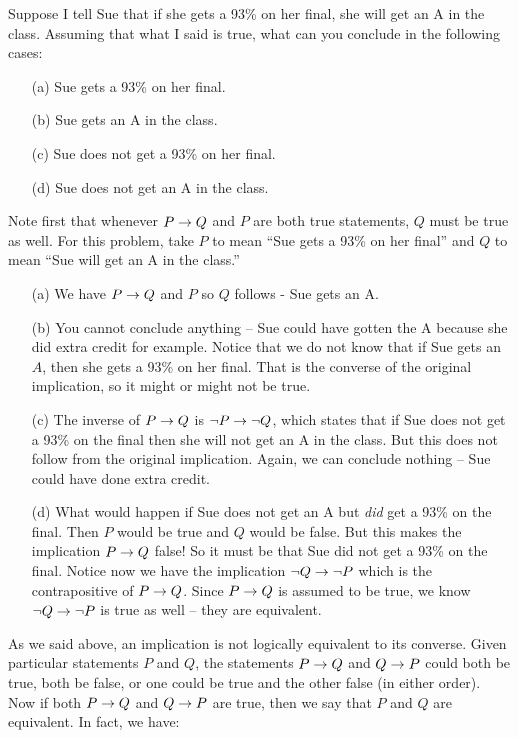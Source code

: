 \documentclass[12pt]{article}
\begin{document}
\begin{example}
  Suppose I tell Sue that if she gets a 93\% on her final, she will get an A in the class.  Assuming that what I said is true, what can you conclude in the following cases:
  \begin{itemize}
    \item[(a)] Sue gets a 93\% on her final.
    \item[(b)] Sue gets an A in the class.
    \item[(c)] Sue does not get a 93\% on her final.
    \item[(d)] Sue does not get an A in the class.
  \end{itemize}
  \begin{solution} Note first that whenever $P \rightarrow Q$ and $P$ are both true statements, $Q$ must be true as well.  For this problem, take $P$ to mean ``Sue gets a 93\% on her final'' and $Q$ to mean ``Sue will get an A in the class.''
    \begin{itemize}
      \item[(a)] We have $P \rightarrow Q$ and $P$ so $Q$ follows - Sue gets an A.
      \item[(b)] You cannot conclude anything -- Sue could have gotten the A because she did extra credit for example.  Notice that we do not know that if Sue gets an $A$, then she gets a 93\% on her final. That is the converse of the original implication, so it might or might not be true.
      \item[(c)] The inverse of $P \rightarrow Q$ is $\neg P \rightarrow \neg Q$, which states that if Sue does not get a 93\% on the final then she will not get an A in the class.  But this does not follow from the original implication.  Again, we can conclude nothing -- Sue could have done extra credit.
      \item[(d)] What would happen if Sue does not get an A but {\em did} get a 93\% on the final.  Then $P$ would be true and $Q$ would be false.  But this makes the implication $P \rightarrow Q$ false!  So it must be that Sue did not get a 93\% on the final.  Notice now we have the implication $\neg Q \rightarrow \neg P$ which is the contrapositive of $P \rightarrow Q$.  Since $P \rightarrow Q$ is assumed to be true, we know $\neg Q \rightarrow \neg P$ is true as well -- they are equivalent.
    \end{itemize}
  \end{solution}
\end{example}

As we said above, an implication is not logically equivalent to its converse.  Given particular statements $P$ and $Q$, the statements $P \rightarrow Q$ and $Q \rightarrow P$ could both be true, both be false, or one could be true and the other false (in either order).  Now if both $P \rightarrow Q$ and $Q \rightarrow P$ are true, then we say that $P$ and $Q$ are equivalent.  In fact, we have:
\end{document}
